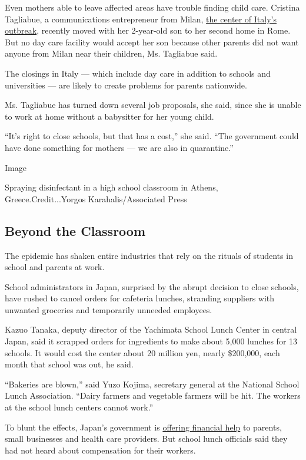 Even mothers able to leave affected areas have trouble finding child
care. Cristina Tagliabue, a communications entrepreneur from Milan,
\href{https://www.nytimes3xbfgragh.onion/2020/02/24/world/europe/24coronavirus-milan-italy.html?action=click\&module=RelatedLinks\&pgtype=Article}{the
center of Italy's outbreak}, recently moved with her 2-year-old son to
her second home in Rome. But no day care facility would accept her son
because other parents did not want anyone from Milan near their
children, Ms. Tagliabue said.

The closings in Italy --- which include day care in addition to schools
and universities --- are likely to create problems for parents
nationwide.

Ms. Tagliabue has turned down several job proposals, she said, since she
is unable to work at home without a babysitter for her young child.

``It's right to close schools, but that has a cost,'' she said. ``The
government could have done something for mothers --- we are also in
quarantine.''

Image

Spraying disinfectant in a high school classroom in Athens,
Greece.Credit...Yorgos Karahalis/Associated Press

\hypertarget{beyond-the-classroom}{%
\subsection{Beyond the Classroom}\label{beyond-the-classroom}}

The epidemic has shaken entire industries that rely on the rituals of
students in school and parents at work.

School administrators in Japan, surprised by the abrupt decision to
close schools, have rushed to cancel orders for cafeteria lunches,
stranding suppliers with unwanted groceries and temporarily unneeded
employees.

Kazuo Tanaka, deputy director of the Yachimata School Lunch Center in
central Japan, said it scrapped orders for ingredients to make about
5,000 lunches for 13 schools. It would cost the center about 20 million
yen, nearly \$200,000, each month that school was out, he said.

``Bakeries are blown,'' said Yuzo Kojima, secretary general at the
National School Lunch Association. ``Dairy farmers and vegetable farmers
will be hit. The workers at the school lunch centers cannot work.''

To blunt the effects, Japan's government is
\href{https://www.japantimes.co.jp/news/2020/02/29/national/science-health/shinzo-abe-coronavirus/\#.Xl-dEBMzb-Y}{offering
financial help} to parents, small businesses and health care providers.
But school lunch officials said they had not heard about compensation
for their workers.

